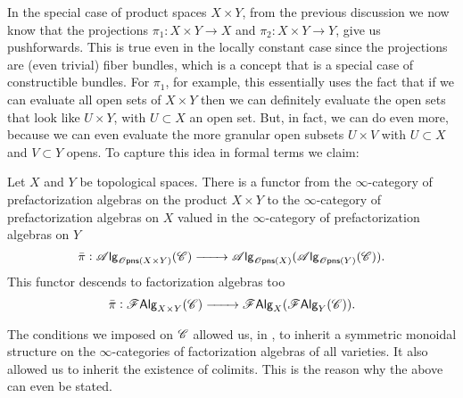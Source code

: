 \documentclass[../text.tex]{subfiles}
\begin{document}
In the special case of product spaces $X \times Y$, from the previous discussion we now know that the projections $\pi_1: X \times Y \rightarrow X$ and $\pi_2: X \times Y \rightarrow Y$, give us pushforwards. This is true even in the locally constant case since the projections are (even trivial) fiber bundles, which is a concept that is a special case of constructible bundles. For $\pi_1$, for example, this essentially uses the fact that if we can evaluate all open sets of $X \times Y$ then we can definitely evaluate the open sets that look like $U \times Y$, with $U \subset X$ an open set. But, in fact, we can do even more, because we can even evaluate the more granular open subsets $U \times V$ with $U \subset X$ and $V \subset Y$ opens. To capture this idea in formal terms we claim:
%
\begin{proposition}\label{prop:exp_of_products}
    Let $X$ and $Y$ be topological spaces. There is a functor from the $\infty$-category of prefactorization algebras on the product $X \times Y$ to the $\infty$-category of prefactorization algebras on $X$ valued in the $\infty$-category of prefactorization algebras on $Y$
    \begin{equation}
        \bar{\pi}: \alg{\opens(X \times Y)}(\catC) \xrightarrow{\qquad} \alg{\opens(X)} (\alg{\opens(Y)} (\catC)).
    \end{equation}
    This functor descends to factorization algebras too
    \begin{equation}
        \bar{\pi}: \mathscr{F} \mathsf{Alg}_{X \times Y}(\mathscr{C}) \xrightarrow{\qquad} \mathscr{F} \mathsf{Alg}_{X}(\mathscr{F} \mathsf{Alg}_{Y}(\mathscr{C})).
    \end{equation}
\end{proposition}

\begin{remark}
    The conditions we imposed on $\mathscr{C}$ allowed us, in , to inherit a symmetric monoidal structure on the $\infty$-categories of factorization algebras of all varieties. It also allowed us to inherit the existence of colimits. This is the reason why the above can even be stated.
\end{remark}
\end{document}
